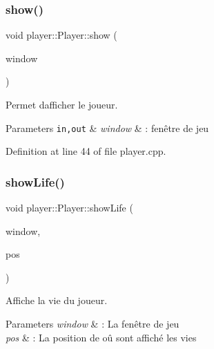 \mbox{\label{structplayer_1_1_player_a3f3f5a529fd56346902ca83672640294}} 
\subsubsection{\texorpdfstring{show()}{show()}}
{\footnotesize\ttfamily void player\+::\+Player\+::show (\begin{DoxyParamCaption}\item[{\hyperlink{class_min_g_l}{Min\+GL} \&}]{window }\end{DoxyParamCaption})}



Permet d\textquotesingle{}afficher le joueur. 


\begin{DoxyParams}[1]{Parameters}
\mbox{\tt in,out}  & {\em window} & \+: fenêtre de jeu \\
\hline
\end{DoxyParams}


Definition at line 44 of file player.\+cpp.

\mbox{\label{structplayer_1_1_player_a26d56b47474cb89219f2aed8d92878d7}} 
\subsubsection{\texorpdfstring{show\+Life()}{showLife()}}
{\footnotesize\ttfamily void player\+::\+Player\+::show\+Life (\begin{DoxyParamCaption}\item[{\hyperlink{class_min_g_l}{Min\+GL} \&}]{window,  }\item[{\hyperlink{classns_graphics_1_1_vec2_d}{ns\+Graphics\+::\+Vec2D}}]{pos }\end{DoxyParamCaption})}



Affiche la vie du joueur. 


\begin{DoxyParams}{Parameters}
{\em window} & \+: La fenêtre de jeu \\
\hline
{\em pos} & \+: La position de oû sont affiché les vies \\
\hline
\end{DoxyParams}


